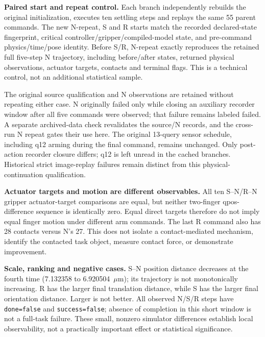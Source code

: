 \documentclass[conference]{IEEEtran}
\begin{document}
\noindent\textbf{Paired start and repeat control.} Each branch independently rebuilds the original initialization, executes ten settling steps and replays the same 55 parent commands. The new N-repeat, S and R starts match the recorded declared-state fingerprint, critical controller/gripper/compiled-model state, and pre-command physics/time/pose identity. Before S/R, N-repeat exactly reproduces the retained full five-step N trajectory, including before/after states, returned physical observations, actuator targets, contacts and terminal flags. This is a technical control, not an additional statistical sample.

\noindent The original source qualification and N observations are retained without repeating either case. N originally failed only while closing an auxiliary recorder window after all five commands were observed; that failure remains labeled failed. A separate archived-data check revalidates the source/N records, and the cross-run N repeat gates their use here. The original 13-query sensor schedule, including q12 arming during the final command, remains unchanged. Only post-action recorder closure differs; q12 is left unread in the cached branches. Historical strict image-replay failures remain distinct from this physical-continuation qualification.



\noindent\textbf{Actuator targets and motion are different observables.} All ten S--N/R--N gripper actuator-target comparisons are equal, but neither two-finger qpos-difference sequence is identically zero. Equal direct targets therefore do not imply equal finger motion under different arm commands. The last R command also has 28 contacts versus N's 27. This does not isolate a contact-mediated mechanism, identify the contacted task object, measure contact force, or demonstrate improvement.

\noindent\textbf{Scale, ranking and negative cases.} S--N position distance decreases at the fourth time (7.132358 to 6.920504~$\mu$m); its trajectory is not monotonically increasing. R has the larger final translation distance, while S has the larger final orientation distance. Larger is not better. All observed N/S/R steps have \texttt{done=false} and \texttt{success=false}; absence of completion in this short window is not a full-task failure. These small, nonzero simulator differences establish local observability, not a practically important effect or statistical significance.
\end{document}
